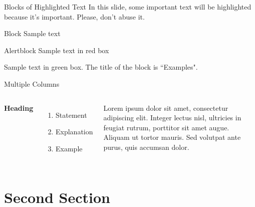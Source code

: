 \documentclass[aspectratio=169,xcolor=dvipsnames]{beamer}
\begin{document}

\begin{frame}{Blocks of Highlighted Text}
    In this slide, some important text will be \alert{highlighted} because it's important. Please, don't abuse it.

    \begin{block}{Block}
        Sample text
    \end{block}
\pause
    \begin{alertblock}{Alertblock}
        Sample text in red box
    \end{alertblock}
\pause
    \begin{examples}
        Sample text in green box. The title of the block is ``Examples".
    \end{examples}
\end{frame}


\begin{frame}{Multiple Columns}
    \begin{columns}[c] %

        \textbf{Heading}
        \begin{enumerate}
            \item Statement
            \item Explanation
            \item Example
        \end{enumerate}

        Lorem ipsum dolor sit amet, consectetur adipiscing elit. Integer lectus nisl, ultricies in feugiat rutrum, porttitor sit amet augue. Aliquam ut tortor mauris. Sed volutpat ante purus, quis accumsan dolor.

    \end{columns}
\end{frame}

\section{Second Section}
\end{document}
